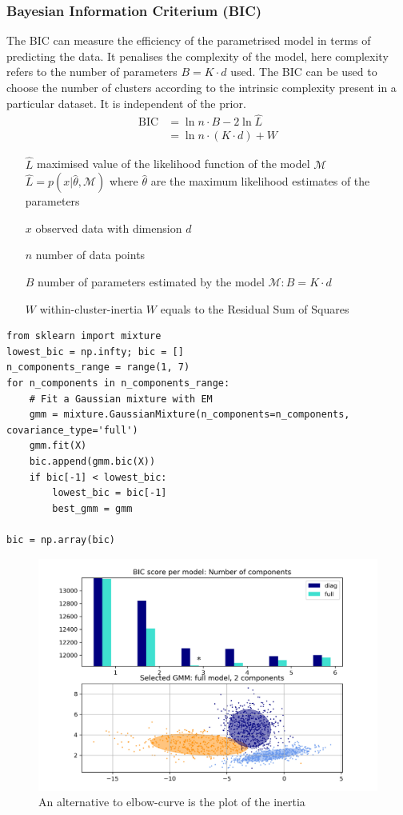 \documentclass[11pt]{article}
\theoremstyle{definition}
\begin{document}
\subsubsection{Bayesian Information Criterium (BIC)}
The BIC can measure the efficiency of the parametrised model in terms of predicting the data. It penalises the complexity of the model, here complexity refers to the number of parameters $B = K\cdot d$ used. The BIC can be used to choose the number of clusters according to the intrinsic complexity present in a particular dataset. It is independent of the prior.
\begin{align*}
	\text{BIC} &= \ln{n} \cdot B - 2 \ln{\hat{L}}\\
	&= \ln{n} \cdot (K \cdot d) + W
\end{align*}
\begin{itemize}[nosep, leftmargin=*, labelindent=1.5cm, labelsep=1cm]
	\item[$\hat{L}$] maximised value of the likelihood function of the model $\mathcal{M}$\\
	$\hat{L} = p(x|\hat{\theta},\mathcal{M})$ where $\hat{\theta}$ are the maximum likelihood estimates of the parameters
	\item[$x$] observed data with dimension $d$
	\item[$n$] number of data points
	\item[$B$] number of parameters estimated by the model $\mathcal{M}: B = K\cdot d$
	\item[$W$] within-cluster-inertia $W$ equals to the Residual Sum of Squares
\end{itemize}
\begin{verbatim}
from sklearn import mixture
lowest_bic = np.infty; bic = []
n_components_range = range(1, 7)
for n_components in n_components_range:
	# Fit a Gaussian mixture with EM
	gmm = mixture.GaussianMixture(n_components=n_components, covariance_type='full')
	gmm.fit(X)
	bic.append(gmm.bic(X))
	if bic[-1] < lowest_bic:
		lowest_bic = bic[-1]
		best_gmm = gmm

bic = np.array(bic)
\end{verbatim}
\begin{figure}[H]
	\centering
	\includegraphics[width=0.8\linewidth]{img/BIC_inertia_plot}
	\caption{An alternative to elbow-curve is the plot of the inertia}
	\label{fig:bicinertiaplot}
\end{figure}
\end{document}
